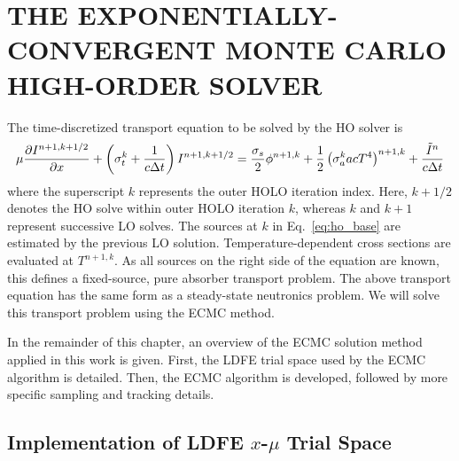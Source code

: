 
\chapter{\uppercase {The Exponentially-Convergent Monte Carlo High-Order Solver}}

The time-discretized transport equation to be solved by the HO solver is
\begin{equation}\label{eq:ho_base}
\mu \frac{\partial I^{n+1,k+1/2}}{\partial x} + \left(\sigma_t^k + \frac{1}{c \Delta t }\right)
I^{n+1,k+1/2}
= \frac{\sigma_s}{2} \phi^{n+1,k} +\frac{1}{2} \left(\sigma_a^k a c T^4
\right)^{n+1,k} + \frac{\tilde I^n}{c\Delta t} 
\end{equation}
where the superscript $k$ represents the outer HOLO iteration index.  Here, $k+1/2$ denotes the
HO solve within outer HOLO iteration $k$, whereas $k$ and $k+1$ represent successive LO
solves. The sources at $k$ in Eq.~\eqref{eq:ho_base} are estimated by the previous LO
solution. Temperature-dependent cross sections are
evaluated at $T^{n+1,k}$.  As all sources on the right side of the equation are known,
this defines a fixed-source, pure absorber transport problem.  The above transport equation has
the same form as a steady-state neutronics problem.  We will solve
this transport problem using the ECMC method. 

In the remainder of this chapter, an overview of
the ECMC solution method applied in this work is given.  First, the LDFE trial
space used by the ECMC algorithm is detailed.  Then, the ECMC algorithm is
developed, followed by more specific sampling and tracking details.  

\section{Implementation of LDFE $x$-$\mu$ Trial Space}

